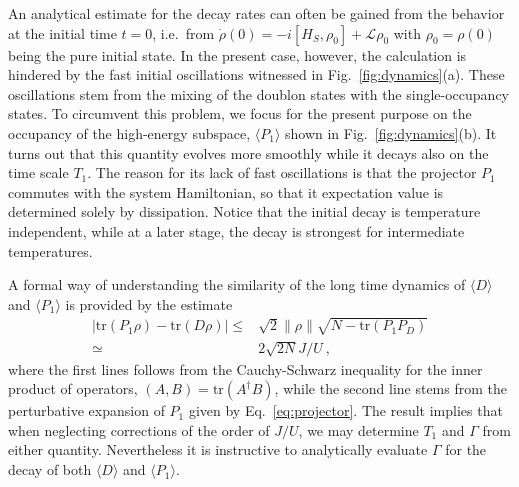 \documentclass[twocolumn,prb,showpacs]{revtex4-1}
\newcommand*{\tr}[1]{\mathrm{tr}\left(#1\right)}
\begin{document}
An analytical estimate for the decay rates can often be gained from the
behavior at the initial time $t=0$, i.e.\ from $\dot\rho(0) =
-i[H_S,\rho_0]+ \mathcal{L}\rho_0$ with $\rho_0=\rho(0)$ being the pure
initial state.  In the present case, however, the calculation is hindered
by the fast initial oscillations witnessed in Fig.~\ref{fig:dynamics}(a).
These oscillations stem from the mixing of the doublon states with the
single-occupancy states.  To circumvent this problem, we focus for the
present purpose on the occupancy of the high-energy subspace, $\langle
P_1\rangle$ shown in Fig.~\ref{fig:dynamics}(b).  It turns out that this
quantity evolves more smoothly while it decays also on the time scale
$T_1$.  The reason for its lack of fast oscillations is that the projector
$P_1$ commutes with the system Hamiltonian, so that it expectation value is
determined solely by dissipation.  Notice that the initial decay is
temperature independent, while at a later stage, the decay is strongest for
intermediate temperatures.

A formal way of understanding the similarity of the long time dynamics of
$\langle D\rangle$ and $\langle P_1\rangle$ is provided by the estimate
\begin{align}
    |\tr{P_1\rho}-\tr{D\rho}|
    \leq {}& \sqrt{2}\|\rho\|\sqrt{N-\tr{P_1P_D}} \\
    \simeq {}& 2\sqrt{2N}J/U \ ,
    \label{eq:bound}
\end{align}
where the first lines follows from the Cauchy-Schwarz inequality for the
inner product of operators, $(A,B)=\tr{A^\dagger B}$,
while the second line stems from the
perturbative expansion of $P_1$ given by Eq.~\eqref{eq:projector}.  The
result implies that when neglecting corrections of the order of $J/U$, we may
determine $T_1$ and $\Gamma$ from either quantity.  Nevertheless it is
instructive to analytically evaluate $\Gamma$ for the decay of both
$\langle D\rangle$ and $\langle P_1\rangle$.
\end{document}
